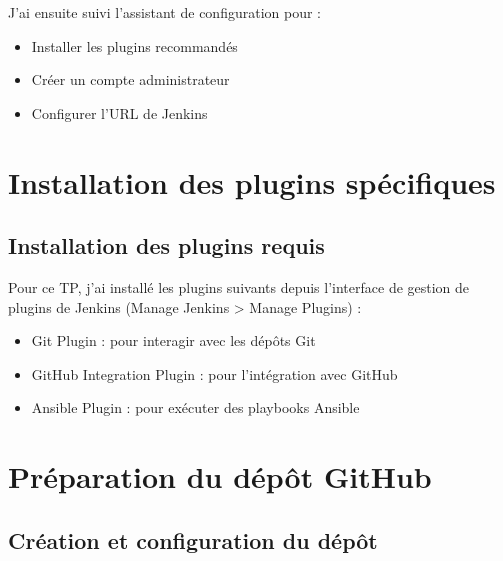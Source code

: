 \documentclass{article}
\begin{document}
J'ai ensuite suivi l'assistant de configuration pour :
\begin{itemize}
    \item Installer les plugins recommandés
    \item Créer un compte administrateur
    \item Configurer l'URL de Jenkins
\end{itemize}


\section{Installation des plugins spécifiques}
\subsection{Installation des plugins requis}
Pour ce TP, j'ai installé les plugins suivants depuis l'interface de gestion de plugins de Jenkins (Manage Jenkins > Manage Plugins) :
\begin{itemize}
    \item Git Plugin : pour interagir avec les dépôts Git
    \item GitHub Integration Plugin : pour l'intégration avec GitHub
    \item Ansible Plugin : pour exécuter des playbooks Ansible
\end{itemize}


\section{Préparation du dépôt GitHub}
\subsection{Création et configuration du dépôt}
\end{document}
